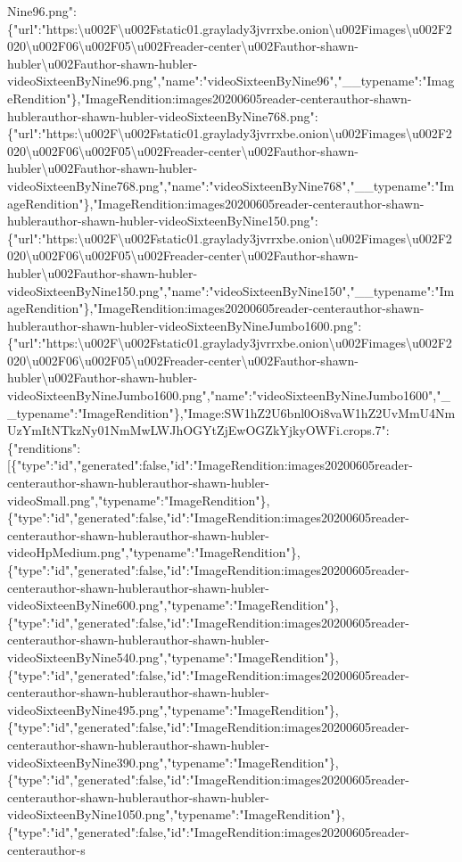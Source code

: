 Nine96.png":\{"url":"https:\textbackslash{}u002F\textbackslash{}u002Fstatic01.graylady3jvrrxbe.onion\textbackslash{}u002Fimages\textbackslash{}u002F2020\textbackslash{}u002F06\textbackslash{}u002F05\textbackslash{}u002Freader-center\textbackslash{}u002Fauthor-shawn-hubler\textbackslash{}u002Fauthor-shawn-hubler-videoSixteenByNine96.png","name":"videoSixteenByNine96","\_\_typename":"ImageRendition"\},"ImageRendition:images20200605reader-centerauthor-shawn-hublerauthor-shawn-hubler-videoSixteenByNine768.png":\{"url":"https:\textbackslash{}u002F\textbackslash{}u002Fstatic01.graylady3jvrrxbe.onion\textbackslash{}u002Fimages\textbackslash{}u002F2020\textbackslash{}u002F06\textbackslash{}u002F05\textbackslash{}u002Freader-center\textbackslash{}u002Fauthor-shawn-hubler\textbackslash{}u002Fauthor-shawn-hubler-videoSixteenByNine768.png","name":"videoSixteenByNine768","\_\_typename":"ImageRendition"\},"ImageRendition:images20200605reader-centerauthor-shawn-hublerauthor-shawn-hubler-videoSixteenByNine150.png":\{"url":"https:\textbackslash{}u002F\textbackslash{}u002Fstatic01.graylady3jvrrxbe.onion\textbackslash{}u002Fimages\textbackslash{}u002F2020\textbackslash{}u002F06\textbackslash{}u002F05\textbackslash{}u002Freader-center\textbackslash{}u002Fauthor-shawn-hubler\textbackslash{}u002Fauthor-shawn-hubler-videoSixteenByNine150.png","name":"videoSixteenByNine150","\_\_typename":"ImageRendition"\},"ImageRendition:images20200605reader-centerauthor-shawn-hublerauthor-shawn-hubler-videoSixteenByNineJumbo1600.png":\{"url":"https:\textbackslash{}u002F\textbackslash{}u002Fstatic01.graylady3jvrrxbe.onion\textbackslash{}u002Fimages\textbackslash{}u002F2020\textbackslash{}u002F06\textbackslash{}u002F05\textbackslash{}u002Freader-center\textbackslash{}u002Fauthor-shawn-hubler\textbackslash{}u002Fauthor-shawn-hubler-videoSixteenByNineJumbo1600.png","name":"videoSixteenByNineJumbo1600","\_\_typename":"ImageRendition"\},"Image:SW1hZ2U6bnl0Oi8vaW1hZ2UvMmU4NmUzYmItNTkzNy01NmMwLWJhOGYtZjEwOGZkYjkyOWFi.crops.7":\{"renditions":{[}\{"type":"id","generated":false,"id":"ImageRendition:images20200605reader-centerauthor-shawn-hublerauthor-shawn-hubler-videoSmall.png","typename":"ImageRendition"\},\{"type":"id","generated":false,"id":"ImageRendition:images20200605reader-centerauthor-shawn-hublerauthor-shawn-hubler-videoHpMedium.png","typename":"ImageRendition"\},\{"type":"id","generated":false,"id":"ImageRendition:images20200605reader-centerauthor-shawn-hublerauthor-shawn-hubler-videoSixteenByNine600.png","typename":"ImageRendition"\},\{"type":"id","generated":false,"id":"ImageRendition:images20200605reader-centerauthor-shawn-hublerauthor-shawn-hubler-videoSixteenByNine540.png","typename":"ImageRendition"\},\{"type":"id","generated":false,"id":"ImageRendition:images20200605reader-centerauthor-shawn-hublerauthor-shawn-hubler-videoSixteenByNine495.png","typename":"ImageRendition"\},\{"type":"id","generated":false,"id":"ImageRendition:images20200605reader-centerauthor-shawn-hublerauthor-shawn-hubler-videoSixteenByNine390.png","typename":"ImageRendition"\},\{"type":"id","generated":false,"id":"ImageRendition:images20200605reader-centerauthor-shawn-hublerauthor-shawn-hubler-videoSixteenByNine1050.png","typename":"ImageRendition"\},\{"type":"id","generated":false,"id":"ImageRendition:images20200605reader-centerauthor-s